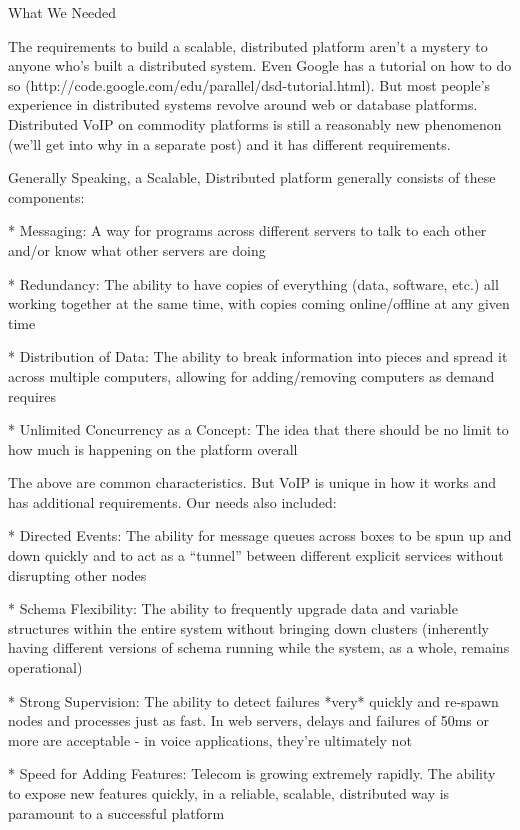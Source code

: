 What We Needed

The requirements to build a scalable, distributed platform aren’t a mystery to anyone who’s built a distributed system. Even Google has a tutorial on how to do so (http://code.google.com/edu/parallel/dsd-tutorial.html). But most people’s experience in distributed systems revolve around web or database platforms. Distributed VoIP on commodity platforms is still a reasonably new phenomenon (we’ll get into why in a separate post) and it has different requirements.

Generally Speaking, a Scalable, Distributed platform generally consists of these components:

* Messaging: A way for programs across different servers to talk to each other and/or know what other servers are doing

* Redundancy: The ability to have copies of everything (data, software, etc.) all working together at the same time, with copies coming online/offline at any given time

* Distribution of Data: The ability to break information into pieces and spread it across multiple computers, allowing for adding/removing computers as demand requires

* Unlimited Concurrency as a Concept: The idea that there should be no limit to how much is happening on the platform overall 

The above are common characteristics. But VoIP is unique in how it works and has additional requirements. Our needs also included:

* Directed Events: The ability for message queues across boxes to be spun up and down quickly and to act as a “tunnel” between different explicit services without disrupting other nodes

* Schema Flexibility: The ability to frequently upgrade data and variable structures within the entire system without bringing down clusters (inherently having different versions of schema running while the system, as a whole, remains operational)

* Strong Supervision: The ability to detect failures *very* quickly and re-spawn nodes and processes just as fast. In web servers, delays and failures of 50ms or more are acceptable - in voice applications, they’re ultimately not

* Speed for Adding Features: Telecom is growing extremely rapidly. The ability to expose new features quickly, in a reliable, scalable, distributed way is paramount to a successful platform

